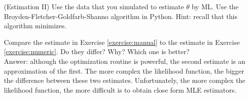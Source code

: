 \begin{exercise} (Estimation II) \label{exercise:numeric}
Use the data that you simulated to estimate $\theta$ by ML. Use the Broyden-Fletcher-Goldfarb-Shanno algorithm in Python. Hint: recall that this algorithm minimizes.
\end{exercise}

\begin{exercise} 
Compare the estimate in Exercise \ref{exercise:manual} to the estimate in Exercise \ref{exercise:numeric}. Do they differ? Why? Which one is better?\\
\noindent Answer: although the optimization routine is powerful, the second estimate is an approximation of the first. The more complex the likelihood function, the bigger the difference between these two estimates. Unfortunately, the more complex the likelihood function,  the more difficult is to obtain close form MLE estimators. 
\end{exercise}

 


























